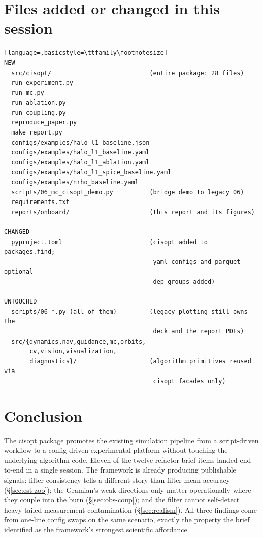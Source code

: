 \documentclass[11pt]{article}
\begin{document}
\section{Files added or changed in this session}

\begin{lstlisting}[language=,basicstyle=\ttfamily\footnotesize]
NEW
  src/cisopt/                           (entire package: 28 files)
  run_experiment.py
  run_mc.py
  run_ablation.py
  run_coupling.py
  reproduce_paper.py
  make_report.py
  configs/examples/halo_l1_baseline.json
  configs/examples/halo_l1_baseline.yaml
  configs/examples/halo_l1_ablation.yaml
  configs/examples/halo_l1_spice_baseline.yaml
  configs/examples/nrho_baseline.yaml
  scripts/06_mc_cisopt_demo.py          (bridge demo to legacy 06)
  requirements.txt
  reports/onboard/                      (this report and its figures)

CHANGED
  pyproject.toml                        (cisopt added to packages.find;
                                         yaml-configs and parquet optional
                                         dep groups added)

UNTOUCHED
  scripts/06_*.py (all of them)         (legacy plotting still owns the
                                         deck and the report PDFs)
  src/{dynamics,nav,guidance,mc,orbits,
       cv,vision,visualization,
       diagnostics}/                    (algorithm primitives reused via
                                         cisopt facades only)
\end{lstlisting}

\section{Conclusion}

The cisopt package promotes the existing simulation pipeline from a
script-driven workflow to a config-driven experimental platform without
touching the underlying algorithm code. Eleven of the twelve refactor-brief
items landed end-to-end in a single session. The framework is already
producing publishable signals: filter consistency tells a different story
than filter mean accuracy (\S\ref{sec:est-zoo}); the Gramian's weak
directions only matter operationally where they couple into the burn
(\S\ref{sec:obs-coup}); and the filter cannot self-detect heavy-tailed
measurement contamination (\S\ref{sec:realism}). All three findings come
from one-line config swaps on the same scenario, exactly the property the
brief identified as the framework's strongest scientific affordance.
\end{document}
